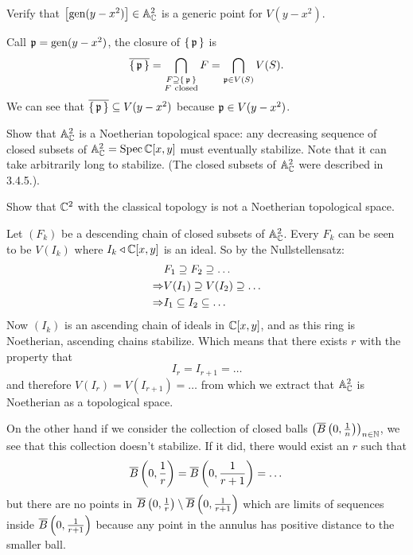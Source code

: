 \documentclass[12pt]{memoir}
\begin{document}
\begin{Ej}[3.5.B Vakil]
    
\end{Ej}

\begin{ptcbr}

\end{ptcbr}

\begin{Ej}[3.6.M Vakil]
    Verify that $\left\lbrack\operatorname{gen}(y-x^2)\right\rbrack\in\mathbb{A}^2_{\mathbb{C}}$
 is a generic point for $V(y-x^2)$. 
\end{Ej}

\begin{ptcbr}
Call $\mathfrak{p}=\operatorname{gen}(y-x^2)$, the closure of $\{\,\mathfrak{p}\,\}$ is 
$$\ov{\set{\lie p}}=\bigcap_{\substack{F\supseteq\set{\lie p}\\ F\ \text{closed}}}F=\bigcap_{\lie p\in V(S)}V(S).$$
We can see that $\overline{\{\,\mathfrak{p}\,\}}\subseteq V(y-x^2)$ because $\mathfrak{p}\in V(y-x^2)$.
\end{ptcbr}

\begin{Ej}[3.6.P Vakil]
    Show that $\mathbb{A}^2_{\mathbb{C}}$ is a Noetherian topological space: any decreasing
sequence of closed subsets of $\mathbb{A}^2_{\mathbb{C}}= \operatorname{Spec}\mathbb{C}[x, y]$ must eventually stabilize. Note that it can take arbitrarily long to stabilize. (The closed subsets of $\mathbb{A}^2_{\mathbb{C}}$ were described in 3.4.5.).\par
Show that $\mathbb{C}^2$ with the classical topology is not a Noetherian topological space.
\end{Ej}

\begin{ptcbr}
Let $(F_k)$ be a descending chain of closed subsets of $\mathbb{A}^2_{\mathbb{C}}$. Every $F_k$ can be seen to be $V(I_k)$ where $I_k\triangleleft\mathbb{C}[x,y]$ is an ideal. So by the Nullstellensatz: 
\begin{align*}
    &F_1\supseteq F_2\supseteq\dots\\
    \Rightarrow&V(I_1)\supseteq V(I_2)\supseteq\dots\\
    \Rightarrow&I_1\subseteq I_2\subseteq\dots
\end{align*}
Now $(I_k)$ is an ascending chain of ideals in $\mathbb{C}[x,y]$, and as this ring is Noetherian, ascending chains stabilize. Which means that there exists $r$ with the property that 
$$I_r=I_{r+1}=\dots$$
and therefore $V(I_r)=V(I_{r+1})=\dots$ from which we extract that $\mathbb{A}^2_{\mathbb{C}}$ is Noetherian as a topological space.\par 
On the other hand if we consider the collection of closed balls $\left(\overline B\left(
0,\frac{1}{n}\right)\right)_{n\in\mathbb{N}}$, we see that this collection doesn't stabilize. If it did, there would exist an $r$ such that 
$$\overline B\left(0,\frac
1r\right)=\overline B\left(0,\frac
{1}{r+1}\right)=\dots$$
but there are no points in $\overline B\left(0,\frac
1r\right)\setminus\overline B\left(0,\frac
{1}{r+1}\right)$ which are limits of sequences inside $\overline B\left(0,\frac
{1}{r+1}\right)$ because any point in the annulus has positive distance to the smaller ball. 
\end{ptcbr}
\end{document}
